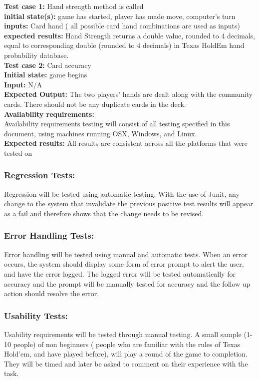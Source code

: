 \documentclass[12pt]{article}
\begin{document}
    \noindent \textbf{Test case 1:} Hand strength method is called\\
    \textbf{initial state(s):} game has started, player has made move, computer’s turn\\
    \textbf{inputs:} Card hand ( all possible card hand combinations are used as inputs)\\
    \textbf{expected results:} Hand Strength returns a double value, rounded to 4 decimals, equal
    to corresponding double (rounded to 4 decimals) in Texas HoldEm hand probability
    database.\\
    
    \noindent \textbf{Test case 2:} Card accuracy \\
    \textbf{Initial state:} game begins\\
    \textbf{Input:} N/A\\
    \textbf{Expected Output:} The two players’ hands are dealt along with the community cards. There should not be any duplicate cards in the deck. \\

	\noindent \textbf{Availability requirements:}\\
    Availability requirements testing will consist of all testing specified in this document,
using machines running OSX, Windows, and Linux.\\
    \textbf{Expected results:} All results are consistent across all the platforms that were tested on


\subsubsection*{Regression Tests:}
Regression will be tested using automatic testing. With the use of Junit, any change to the system that invalidate the previous positive test results will appear as a fail and therefore shows that the change needs to be revised.

\subsubsection*{Error Handling Tests:}
Error handling will be tested using manual and automatic tests. When an error occurs, the system should display some form of error prompt to alert the user, and have the error logged. The logged error will be tested automatically for accuracy and the prompt will be manually tested for accuracy and the follow up action should resolve the error. 

\subsubsection*{Usability Tests:}
Usability requirements will be tested through manual testing. A small sample (1-10 people) of non beginners ( people who are familiar with the rules of Texas Hold'em, and have played before), will play a round of the game to completion. They will be timed and later be asked to comment on their experience with the task.
\end{document}
